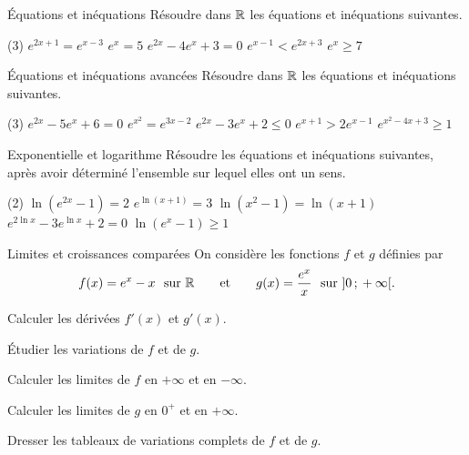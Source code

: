 
\begin{exercice}[2]{Équations et inéquations}
Résoudre dans $\mathbb{R}$ les équations et inéquations suivantes.
\begin{tasks}(3)
  \task $e^{2x+1}=e^{x-3}$
  \task $e^{x}=5$
  \task $e^{2x}-4e^{x}+3=0$
  \task $e^{x-1}<e^{2x+3}$
  \task $e^{x}\geq 7$
\end{tasks}
\end{exercice}

\begin{exercice}[2]{Équations et inéquations avancées}
Résoudre dans $\mathbb{R}$ les équations et inéquations suivantes.
\begin{tasks}(3)
  \task $e^{2x}-5e^{x}+6=0$
  \task $e^{x^{2}}=e^{3x-2}$
  \task $e^{2x}-3e^{x}+2\leq0$
  \task $e^{x+1}>2e^{x-1}$
  \task $e^{x^{2}-4x+3}\geq1$
\end{tasks}
\end{exercice}

\begin{exercice}[2]{Exponentielle et logarithme}
Résoudre les équations et inéquations suivantes, après avoir déterminé l'ensemble sur lequel elles ont un sens.
\begin{tasks}(2)
  \task $\ln\left(e^{2x}-1\right)=2$
  \task $e^{\ln(x+1)}=3$
  \task $\ln\left(x^{2}-1\right)=\ln(x+1)$
  \task $e^{2\ln x}-3e^{\ln x}+2=0$
  \task $\ln\left(e^{x}-1\right)\geq1$
\end{tasks}
\end{exercice}

\begin{exercice}[2]{Limites et croissances comparées}
On considère les fonctions $f$ et $g$ définies par
\[
  f(x)=e^{x}-x \ \text{ sur } \mathbb{R}
  \qquad\text{et}\qquad
  g(x)=\frac{e^{x}}{x} \ \text{ sur } \mathopen{]}0\,{;}\,+\infty\mathclose{[}.
\]
\begin{questions}
  \item Calculer les dérivées $f'(x)$ et $g'(x)$.
  \item Étudier les variations de $f$ et de $g$.
  \item Calculer les limites de $f$ en $+\infty$ et en $-\infty$.
  \item Calculer les limites de $g$ en $0^{+}$ et en $+\infty$.
  \item Dresser les tableaux de variations complets de $f$ et de $g$.
\end{questions}
\end{exercice}

